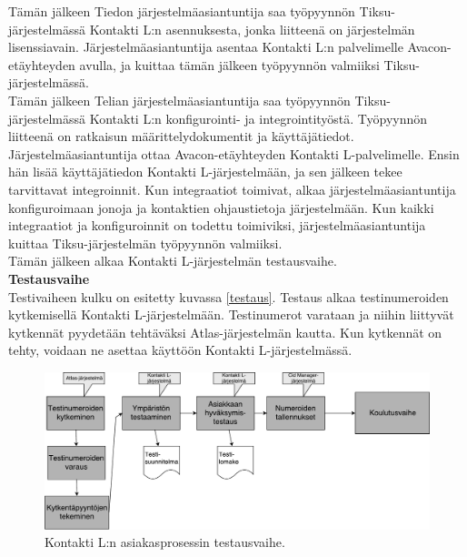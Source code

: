 \documentclass[finnish,12pt,a4paper,pdftex]{article}
\begin{document}
Tämän jälkeen Tiedon järjestelmäasiantuntija saa työpyynnön Tiksu-järjestelmässä Kontakti L:n asennuksesta, jonka liitteenä on järjestelmän lisenssiavain. Järjestelmäasiantuntija asentaa Kontakti L:n palvelimelle Avacon-etäyhteyden avulla, ja kuittaa tämän jälkeen työpyynnön valmiiksi Tiksu-järjestelmässä.\\

Tämän jälkeen Telian järjestelmäasiantuntija saa työpyynnön Tiksu-järjestelmässä Kontakti L:n konfigurointi- ja integrointityöstä. Työpyynnön liitteenä on ratkaisun määrittelydokumentit ja käyttäjätiedot. Järjestelmäasiantuntija ottaa Avacon-etäyhteyden Kontakti L-palvelimelle. Ensin hän lisää käyttäjätiedon Kontakti L-järjestelmään, ja sen jälkeen tekee tarvittavat integroinnit. Kun integraatiot toimivat, alkaa järjestelmäasiantuntija konfiguroimaan jonoja ja kontaktien ohjaustietoja järjestelmään. Kun kaikki integraatiot ja konfiguroinnit on todettu toimiviksi, järjestelmäasiantuntija kuittaa Tiksu-järjestelmän työpyynnön valmiiksi.\\

Tämän jälkeen alkaa Kontakti L-järjestelmän testausvaihe.\\

\textbf{Testausvaihe}\\


Testivaiheen kulku on esitetty kuvassa \ref{testaus}. Testaus alkaa testinumeroiden kytkemisellä Kontakti L-järjestelmään. Testinumerot varataan ja niihin liittyvät kytkennät pyydetään tehtäväksi Atlas-järjestelmän kautta. Kun kytkennät on tehty, voidaan ne asettaa käyttöön Kontakti L-järjestelmässä. \\

\begin{figure}[!h]
    \centering
    \includegraphics[scale=0.3]{images/Testaus.pdf}
    \caption{Kontakti L:n asiakasprosessin testausvaihe.}
    \label{fig:testaus}
\end{figure}
\end{document}
